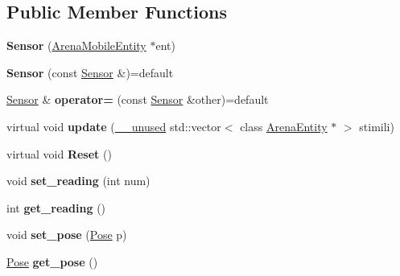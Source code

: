 \subsection*{Public Member Functions}
\begin{DoxyCompactItemize}
\item 
{\bfseries Sensor} (\hyperlink{classArenaMobileEntity}{Arena\+Mobile\+Entity} $\ast$ent)\hypertarget{classSensor_a13c4b3a00db6e21e2ac33647440fdc37}{}\label{classSensor_a13c4b3a00db6e21e2ac33647440fdc37}

\item 
{\bfseries Sensor} (const \hyperlink{classSensor}{Sensor} \&)=default\hypertarget{classSensor_ac1d81bc5c639eeafed38d69e40dc07b8}{}\label{classSensor_ac1d81bc5c639eeafed38d69e40dc07b8}

\item 
\hyperlink{classSensor}{Sensor} \& {\bfseries operator=} (const \hyperlink{classSensor}{Sensor} \&other)=default\hypertarget{classSensor_a48b21cd29fa3f183a2fb9e6447de2219}{}\label{classSensor_a48b21cd29fa3f183a2fb9e6447de2219}

\item 
virtual void {\bfseries update} (\hyperlink{common_8h_a2e3484535ee610c8e19e9859563abe48}{\+\_\+\+\_\+unused} std\+::vector$<$ class \hyperlink{classArenaEntity}{Arena\+Entity} $\ast$ $>$ stimili)\hypertarget{classSensor_a152c11dc8df6982d0fad5b2082055e78}{}\label{classSensor_a152c11dc8df6982d0fad5b2082055e78}

\item 
virtual void {\bfseries Reset} ()\hypertarget{classSensor_a5e6ad1aa7b2c48e59851e03404dacbde}{}\label{classSensor_a5e6ad1aa7b2c48e59851e03404dacbde}

\item 
void {\bfseries set\+\_\+reading} (int num)\hypertarget{classSensor_a3ee42616cfe5e55c1efa2a4fd6761a44}{}\label{classSensor_a3ee42616cfe5e55c1efa2a4fd6761a44}

\item 
int {\bfseries get\+\_\+reading} ()\hypertarget{classSensor_ae574c5b7e58bdbbc47c0d83a7561fa19}{}\label{classSensor_ae574c5b7e58bdbbc47c0d83a7561fa19}

\item 
void {\bfseries set\+\_\+pose} (\hyperlink{structPose}{Pose} p)\hypertarget{classSensor_a877b65abc60821f62fe16771923fba38}{}\label{classSensor_a877b65abc60821f62fe16771923fba38}

\item 
\hyperlink{structPose}{Pose} {\bfseries get\+\_\+pose} ()\hypertarget{classSensor_afa533b8d8bb5f3787682ffc5ab8c989c}{}\label{classSensor_afa533b8d8bb5f3787682ffc5ab8c989c}


\end{DoxyCompactItemize}
